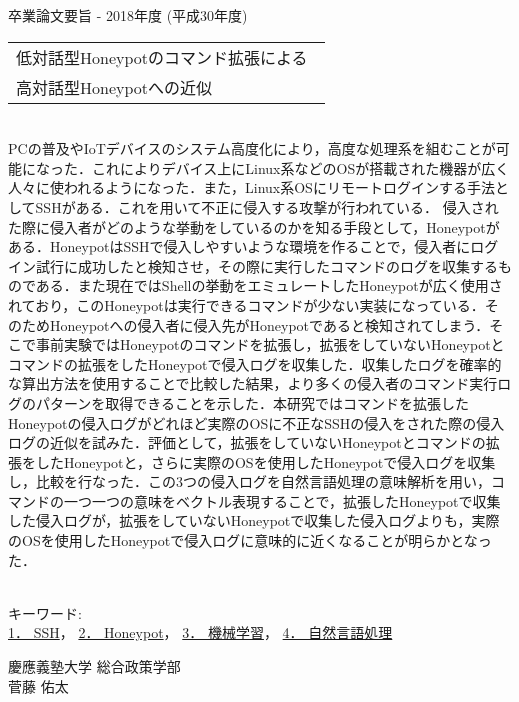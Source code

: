 卒業論文要旨 - 2018年度 (平成30年度)
\begin{center}
\begin{large}
\begin{tabular}{|M{0.97\linewidth}|}
    \hline
   低対話型Honeypotのコマンド拡張による\\高対話型Honeypotへの近似\\
    \hline
\end{tabular}
\end{large}
\end{center}

~ \\

PCの普及やIoTデバイスのシステム高度化により，高度な処理系を組むことが可能になった．これによりデバイス上にLinux系などのOSが搭載された機器が広く人々に使われるようになった．また，Linux系OSにリモートログインする手法としてSSHがある．これを用いて不正に侵入する攻撃が行われている．
侵入された際に侵入者がどのような挙動をしているのかを知る手段として，Honeypotがある．HoneypotはSSHで侵入しやすいような環境を作ることで，侵入者にログイン試行に成功したと検知させ，その際に実行したコマンドのログを収集するものである．また現在ではShellの挙動をエミュレートしたHoneypotが広く使用されており，このHoneypotは実行できるコマンドが少ない実装になっている．そのためHoneypotへの侵入者に侵入先がHoneypotであると検知されてしまう．そこで事前実験ではHoneypotのコマンドを拡張し，拡張をしていないHoneypotとコマンドの拡張をしたHoneypotで侵入ログを収集した．収集したログを確率的な算出方法を使用することで比較した結果，より多くの侵入者のコマンド実行ログのパターンを取得できることを示した．本研究ではコマンドを拡張したHoneypotの侵入ログがどれほど実際のOSに不正なSSHの侵入をされた際の侵入ログの近似を試みた．評価として，拡張をしていないHoneypotとコマンドの拡張をしたHoneypotと，さらに実際のOSを使用したHoneypotで侵入ログを収集し，比較を行なった．この3つの侵入ログを自然言語処理の意味解析を用い，コマンドの一つ一つの意味をベクトル表現することで，拡張したHoneypotで収集した侵入ログが，拡張をしていないHoneypotで収集した侵入ログよりも，実際のOSを使用したHoneypotで侵入ログに意味的に近くなることが明らかとなった．


~ \\
キーワード:\\
\underline{1． SSH}，
\underline{2． Honeypot}，
\underline{3． 機械学習}，
\underline{4． 自然言語処理}
\begin{flushright}
慶應義塾大学 総合政策学部\\
菅藤 佑太
\end{flushright}
